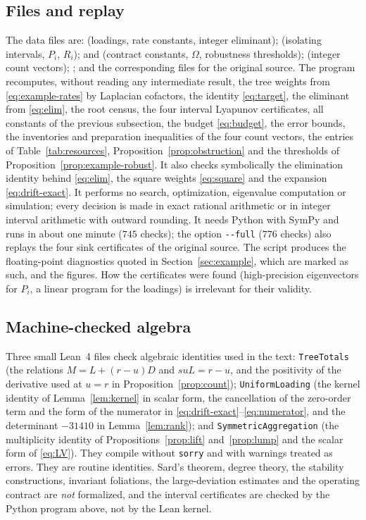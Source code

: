 \subsection{Files and replay}
The data files are:  (loadings, rate constants,
integer eliminant);  (isolating intervals, \(P_i\),
\(R_i\));  and
 (contract constants, \(\Omega\), robustness
thresholds);  (integer count vectors);
; and the corresponding files for the original source. The program
 recomputes, without reading any intermediate result, the tree weights
from \eqref{eq:example-rates} by Laplacian cofactors, the identity \eqref{eq:target}, the
eliminant from \eqref{eq:elim}, the root census, the four interval Lyapunov certificates, all
constants of the previous subsection, the budget \eqref{eq:budget}, the error bounds, the
inventories and preparation inequalities of the four count vectors, the entries of
Table~\ref{tab:resources}, Proposition~\ref{prop:obstruction} and the thresholds of
Proposition~\ref{prop:example-robust}. It also checks symbolically the elimination identity
behind \eqref{eq:elim}, the square weights \eqref{eq:square} and the expansion
\eqref{eq:drift-exact}. It performs no search, optimization, eigenvalue computation or
simulation; every decision is made in exact rational arithmetic or in integer interval
arithmetic with outward rounding. It needs Python with SymPy and runs in about one minute
(\(745\) checks); the option \texttt{-{}-full} (\(776\) checks) also replays the four sink
certificates of the original source. The script  produces the floating-point diagnostics
quoted in Section~\ref{sec:example}, which are marked as such, and 
the figures. How the certificates were found (high-precision eigenvectors for \(P_i\), a linear
program for the loadings) is irrelevant for their validity.

\subsection{Machine-checked algebra}
Three small Lean~4 files \cite{Lean4,Mathlib} check algebraic identities used in the text:
\texttt{TreeTotals} (the relations \(M=L+(r-u)D\) and \(su L=r-u\), and the positivity of the
derivative used at \(u=r\) in Proposition~\ref{prop:count}); \texttt{UniformLoading} (the
kernel identity of Lemma~\ref{lem:kernel} in scalar form, the cancellation of the zero-order
term and the form of the numerator in \eqref{eq:drift-exact}--\eqref{eq:numerator}, and the
determinant \(-31410\) in Lemma~\ref{lem:rank}); and \texttt{SymmetricAggregation} (the
multiplicity identity of Propositions~\ref{prop:lift} and~\ref{prop:lump} and the scalar form
of \eqref{eq:LV}). They compile without \texttt{sorry} and with warnings treated as errors.
They are routine identities. Sard's theorem, degree theory, the stability constructions,
invariant foliations, the large-deviation estimates and the operating contract are \emph{not}
formalized, and the interval certificates are checked by the Python program above, not by the
Lean kernel.
